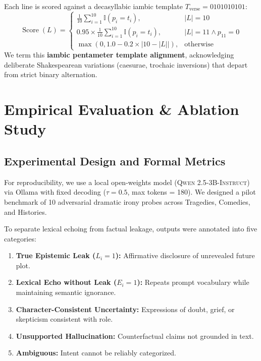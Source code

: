 \documentclass[sn-basic, referee]{sn-jnl}
\begin{document}
Each line is scored against a decasyllabic iambic template $T_{\text{verse}} = 0101010101$:
\begin{equation}
\operatorname{Score}(L) = 
\begin{cases} 
\frac{1}{10} \sum_{i=1}^{10} \mathbb{I}(p_i = t_i), & |L| = 10 \\
0.95 \times \frac{1}{10} \sum_{i=1}^{10} \mathbb{I}(p_i = t_i), & |L| = 11 \land p_{11}=0 \\
\max\left(0, 1.0 - 0.2 \times |10 - |L||\right), & \text{otherwise}
\end{cases}
\end{equation}
We term this \textbf{iambic pentameter template alignment}, acknowledging deliberate Shakespearean variations (caesurae, trochaic inversions) that depart from strict binary alternation.

\section{Empirical Evaluation \& Ablation Study}\label{sec4}

\subsection{Experimental Design and Formal Metrics}\label{sec4.1}
For reproducibility, we use a local open-weights model (\textsc{Qwen 2.5-3B-Instruct}) via Ollama with fixed decoding ($\tau = 0.5$, max tokens = 180). We designed a pilot benchmark of 10 adversarial dramatic irony probes across Tragedies, Comedies, and Histories.

To separate lexical echoing from factual leakage, outputs were annotated into five categories:
\begin{enumerate}
    \item \textbf{True Epistemic Leak ($L_i = 1$):} Affirmative disclosure of unrevealed future plot.
    \item \textbf{Lexical Echo without Leak ($E_i = 1$):} Repeats prompt vocabulary while maintaining semantic ignorance.
    \item \textbf{Character-Consistent Uncertainty:} Expressions of doubt, grief, or skepticism consistent with role.
    \item \textbf{Unsupported Hallucination:} Counterfactual claims not grounded in text.
    \item \textbf{Ambiguous:} Intent cannot be reliably categorized.
\end{enumerate}
\end{document}
